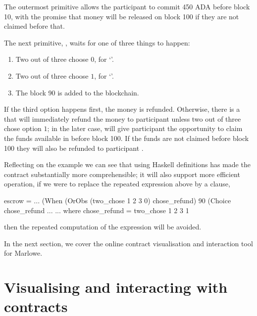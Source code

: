 \documentclass[runningheads]{llncs}
\begin{document}
The outermost primitive  allows the participant  to commit 450 ADA before 
block 10, with the promise that money will be released on block 100 if they are not claimed before that.

The next primitive, , waits for one of three things to happen:
\begin{enumerate}
 \item Two out of three choose $0$, for `'. 
 \item Two out of three choose $1$, for `'.
 \item The block 90 is added to the blockchain.
\end{enumerate}

If the third option happens first, the money is refunded. Otherwise, there is a  that will 
immediately refund the money to participant  unless two out of three chose option $1$; in the later 
case,  will give participant  the opportunity to claim the funds available in 
 before block 100. If the funds are not claimed before block 100 they will also be refunded to 
participant .

Reflecting on the example we can see that using Haskell definitions has made the contract substantially more 
comprehensible; it will also support more efficient operation, if we were to replace the repeated  expression 
 above by a  clause, 
\begin{haskellcode}
escrow = ...
                    (When (OrObs (two_chose 1 2 3 0)
                                 chose_refund)
                          90
                          (Choice chose_refund
                           ...
         ...
         where 
         chose_refund = two_chose 1 2 3 1                 
\end{haskellcode}
then the repeated computation of the expression will be avoided.

In the next section, we cover the online contract visualisation and interaction tool for Marlowe.

\section{Visualising and interacting with contracts}

\label{section:tool}
\end{document}
